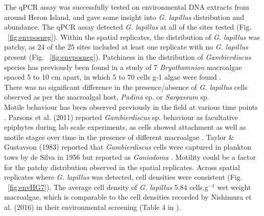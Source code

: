\documentclass[12pt]{article}
\begin{document}
The qPCR assay was successfully tested on environmental DNA extracts from around Heron Island, and gave some insight into \emph{G. lapillus} distribution and abundance. 
The qPCR assay detected \emph{G. lapillus} at all of the sites tested (Fig. ~\ref{fig:envposneg}). 
Within the spatial replicates, the distribution of \emph{G. lapillus} was patchy, as 24 of the 25 sites included at least one replicate with no \textit{G. lapillus} present (Fig. ~\ref{fig:envposneg}). 
Patchiness in the distribution of \textit{Gambierdiscus} species has previously been found in a study of 7 \emph{Bryothamnion} macroalgae spaced 5 to 10 cm apart, in which 5 to 70 cells g-1 algae were found \citep{taylor1986underwater}.\\
There was no significant difference in the presence/absence of \emph{G. lapillus} cells observed as per the macroalgal host, \emph{Padina} sp. or \emph{Sargassum} sp.\\
Motile behaviour has been observed previously in the field at various time points \citep{yasumoto1977finding,bomber1987ecology}. 
Parsons et al. (2011) reported \emph{Gambierdiscus} sp. behaviour as facultative epiphytes during lab scale experiments, as cells showed attachment as well as motile stages over time in the presence of different macroalgae \citep{parsons2011examination}. 
Taylor \& Gustavson (1983) reported that \emph{Gambierdiscus} cells were captured in plankton tows by de Silva in 1956 but reported as \emph{Goniodoma} \citep{taylor1986underwater}.
Motility could be a factor for the patchy distribution observed in the spatial replicates. 
Across spatial replicates where \emph{G. lapillus} was detected, cell densities were consistent (Fig. ~\ref{fig:envHG7}). 
The average cell density of \emph{G. lapillus} 5.84 cells.g$^{-1}$ wet weight macroalgae, which is comparable to the cell densities recorded by Nishimura et al. (2016) in their environmental screening (Table 4 in \citep{nishimura2016quantitative}).\\
\end{document}
